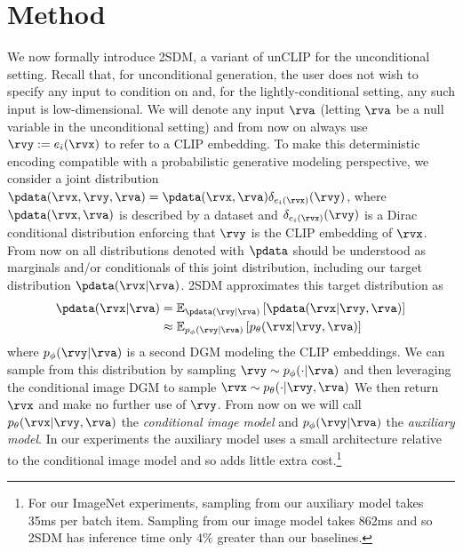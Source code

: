 \section{Method} \label{sec:2sdm-2sdm-method}
We now formally introduce 2SDM, a variant of unCLIP for the unconditional setting. Recall that, for unconditional generation, the user does not wish to specify any input to condition on and, for the lightly-conditional setting, any such input is low-dimensional. We will denote any input $\rva$ (letting $\rva$ be a null variable in the unconditional setting) and from now on always use $\rvy := e_i(\rvx)$ to refer to a CLIP embedding. To make this deterministic encoding compatible with a probabilistic generative modeling perspective, we consider a joint distribution $\pdata(\rvx, \rvy, \rva)=\pdata(\rvx, \rva)\delta_{e_i(\rvx)}(\rvy)$, where $\pdata(\rvx, \rva)$ is described by a dataset and $\delta_{e_i(\rvx)}(\rvy)$ is a Dirac conditional distribution enforcing that $\rvy$ is the CLIP embedding of $\rvx$. From now on all distributions denoted with $\pdata$ should be understood as marginals and/or conditionals of this joint distribution, including our target distribution $\pdata(\rvx|\rva)$. 2SDM approximates this target distribution as
%
\begin{align} \label{eq:no-a}
    \pdata(\rvx|\rva) &= \mathbb{E}_{\pdata(\rvy|\rva)} \left[ \pdata(\rvx|\rvy,\rva) \right] \\
    &\approx \mathbb{E}_{p_\phi(\rvy|\rva)} \left[ p_\theta(\rvx|\rvy,\rva) \right] %
\end{align}
where $p_\phi(\rvy|\rva)$ is a second DGM modeling the CLIP embeddings. We can sample from this distribution by sampling $\rvy\sim p_\phi(\cdot|\rva)$ and then leveraging the conditional image DGM to sample $\rvx \sim p_\theta(\cdot|\rvy,\rva)$ We then return $\rvx$ and make no further use of $\rvy$.
%
From now on we will call $p_\theta(\rvx|\rvy,\rva)$ the \textit{conditional image model} and $p_\phi(\rvy|\rva)$ the \textit{auxiliary model}. In our experiments the auxiliary model uses a small architecture relative to the conditional image model and so adds little extra cost.\footnote{For our ImageNet experiments, sampling from our auxiliary model takes 35ms per batch item. Sampling from our image model takes 862ms and so 2SDM has inference time only $4\%$ greater than our baselines.}




